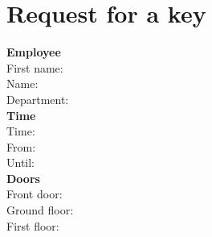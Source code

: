 \documentclass{article}
\begin{document}
\section*{Request for a key}
\begin{Form}

  \textbf{Employee}\\
  First name:   \TextField[name=vorname]{} \\
  Name:         \TextField[name=name]{} \\
  Department:    \\

  \textbf{Time} \\
  Time:          \\
  From:         \TextField[name=from]{} \\
  Until:        \TextField[name=until]{} \\

  \textbf{Doors} \\
  Front door:   \CheckBox[name=ht]{} \\
  Ground floor: \CheckBox[name=e1]{} \\
  First floor:  \CheckBox[name=e2]{} \\

\end{Form}
\end{document}
